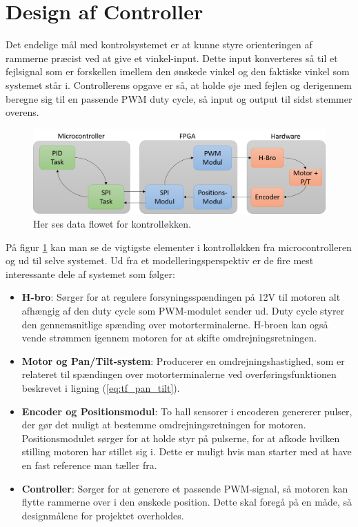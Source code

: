 \section{Design af Controller}

Det endelige mål med kontrolsystemet er at kunne styre orienteringen af rammerne præcist ved at give et vinkel-input. Dette input konverteres så til et fejlsignal som er forskellen imellem den ønskede vinkel og den faktiske vinkel som systemet står i. Controllerens opgave er så, at holde øje med fejlen og derigennem beregne sig til en passende PWM duty cycle, så input og output til sidst stemmer overens. 

\begin{figure}[ht]
	\begin{center}
		\includegraphics[scale=0.5]{Billeder/Controller_Blok.png}
	\end{center}
\caption{Her ses data flowet for kontrolløkken.}
\label{fig:Blok_Model}
\end{figure}

På figur \ref{fig:Blok_Model} kan man se de vigtigste elementer i kontrolløkken fra microcontrolleren og ud til selve systemet. Ud fra et modelleringsperspektiv er de fire mest interessante dele af systemet som følger:

\begin{itemize}
\item \textbf{H-bro}: Sørger for at regulere forsyningsspændingen på 12V til motoren alt afhængig af den duty cycle som PWM-modulet sender ud. Duty cycle styrer den gennemsnitlige spænding over motorterminalerne. H-broen kan også vende strømmen igennem motoren for at skifte omdrejningsretningen.
\item \textbf{Motor og Pan/Tilt-system}: Producerer en omdrejningshastighed, som er relateret til spændingen over motorterminalerne ved overføringsfunktionen beskrevet i ligning (\ref{eq:tf_pan_tilt}).
\item \textbf{Encoder og Positionsmodul}: To hall sensorer i encoderen genererer pulser, der gør det muligt at bestemme omdrejningsretningen for motoren. Positionsmodulet sørger for at holde styr på pulserne, for at afkode hvilken stilling motoren har stillet sig i. Dette er muligt hvis man starter med at have en fast reference man tæller fra.
\item \textbf{Controller}: Sørger for at generere et passende PWM-signal, så motoren kan flytte rammerne over i den ønskede position. Dette skal foregå på en måde, så designmålene for projektet overholdes.
\end{itemize}

